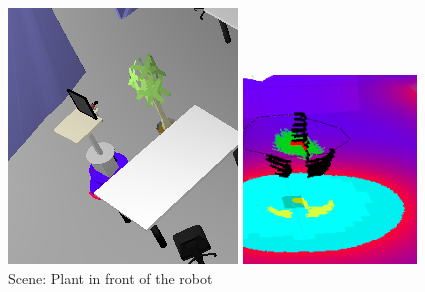 \documentclass[12pt]{article}
\begin{document}
\begin{figure}[!h]
    \includegraphics[width=\linewidth]{voxellayerscene.png}
  \caption{Scene: Plant in front of the robot}
\endminipage\hfill
{}
  \includegraphics[width=\linewidth]{voxellayerparam1.png}

\end{figure}
\end{document}
